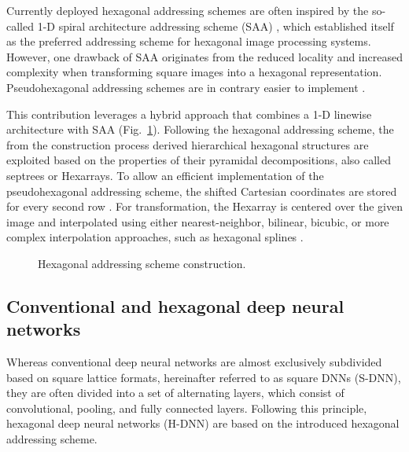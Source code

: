 \documentclass{article}
\begin{document}
Currently deployed hexagonal addressing schemes are often inspired by the so-called 1-D spiral architecture addressing scheme (SAA) \cite{Burt1980}, which established itself as the preferred addressing scheme for hexagonal image processing systems. However, one drawback of SAA originates from the reduced locality and increased complexity when transforming square images into a hexagonal representation. Pseudohexagonal addressing schemes are in contrary easier to implement \cite{Fitz1996}.

This contribution leverages a hybrid approach that combines a 1-D linewise architecture with SAA (Fig.~\ref{figure:A_2}). Following the hexagonal addressing scheme, the from the construction process derived hierarchical hexagonal structures are exploited based on the properties of their pyramidal decompositions, also called septrees or Hexarrays. To allow an efficient implementation of the pseudohexagonal addressing scheme, the shifted Cartesian coordinates are stored for every second row \cite{Her1994}. For transformation, the Hexarray is centered over the given image and interpolated using either nearest-neighbor, bilinear, bicubic, or more complex interpolation approaches, such as hexagonal splines \cite{Her1994}.

\begin{figure}[tb]
	\centering


	\caption{Hexagonal addressing scheme construction. \cite{Schlosser2019}}
	\label{figure:A_2}
\end{figure}


\subsection{Conventional and hexagonal deep neural networks}

Whereas conventional deep neural networks are almost exclusively subdivided based on square lattice formats, hereinafter referred to as square DNNs (S-DNN), they are often divided into a set of alternating layers, which consist of convolutional, pooling, and fully connected layers. Following this principle, hexagonal deep neural networks (H-DNN) are based on the introduced hexagonal addressing scheme.
\end{document}

